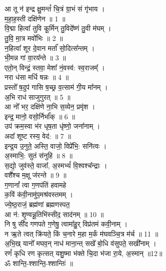 \section{}
आ तू न॑ इन्द्र क्षु॒मन्तं᳚ चि॒त्रं ग्रा॒भं सं गृ॑भाय ।\\
म॒हा॒ह॒स्ती दक्षि॑णेन ॥ 1 ॥\\
वि॒द्मा हित्वा᳚ तुवि कू॒र्मिन् तु॒विदे᳚ष्णं तु॒वी म॑घम् ।\\
तु॒वि॒ मा॒त्र मवो᳚भिः ॥ 2 ॥\\
न॒हित्वा᳚ शूर दे॒वान मर्ता᳚ सो॒दित्स᳚न्तम् ।\\
भी॒मन्न गां वा॒रय᳚न्ते ॥ 3 ॥\\
एतो॒न् विन्द्रं॒ स्तवा॒ मेशा᳚ नं॒वस्व॑: स्व॒राजम्᳚ ।\\
नरा ध॑सा मर्धि षन्नः ॥ 4 ॥\\
प्रस्तो᳚ ष॒दुप॑ गासि ष॒च्छ्र व॒त्साम॑ गी॒य मा᳚नम् ।\\
अ॒भि राध॑ साजुगुरत् ॥ 5 ॥\\
आ नो᳚ भर॒ दक्षि॑णे ना॒भि स॒व्येन॒ प्रमृ॑श ।\\
इन्द्र॒ मानो॒ वसो॒र्निर्भा᳚क् ॥ 6 ॥\\
उप॑ क्रम॒स्वा भ॑र धृष॒ता धृ॑ष्णो॒ जना᳚नाम् ।\\
अदा᳚ शूष्ट रस्य॒ वेद॑: ॥ 7 ॥\\
इन्द्र॒य उ॒नुते॒ अस्ति॒ वाजो॒ विप्रे᳚भि॒: सनि॑त्वः ।\\
अ॒स्माभि॒: सुतं स॑नुहि ॥ 8 ॥\\
स॒द्यो॒ जुव॑स्ते॒ वाजा᳚, अ॒स्मभ्यं᳚ वि॒श्वश्च᳚न्द्राः ।\\
वशै᳚श्च म॒क्षू ज॑रन्ते ॥ 9 ॥\\
ग॒णानां᳚ त्वा ग॒णप॑तिं हवामहे\\
क॒विं क॑वी॒नामु॑प॒मश्र॑वस्तमम् ।\\
ज्ये॒ष्ठ॒राजं॒ ब्रह्म॑णां ब्रह्मणस्पत॒\\
आ न॑: शृ॒ण्वन्नू॒तिभि॑स्सीद॒ साद॑नम् ॥ 10 ॥\\
नि षु सी᳚द गणपते ग॒णेषु॒ त्वामा᳚हु॒र् विप्र॑तमं कवी॒नाम् ।\\
न ऋ॒ते त्वत् क्रि॑यते॒ किं च॒नारे म॒हा म॒र्कं म॑घवञ्चि॒त्र म॑र्च ॥ 11 ॥\\
अ॒भि॒ख् यानो᳚ मघव॒न् नाध॑ माना॒न्त् सखे᳚ बो॒धि व॑सुपते॒ सखी᳚नाम् ।\\
रणं᳚ कृधि रण कृत्सत् यशु॒ष्मा भ॑क्ते चि॒दा भ॑जा रा॒ये, अ॒स्मान् ॥12॥\\
ॐ शान्ति॒-श्शान्ति॒-श्शान्तिः॑ ॥\\
